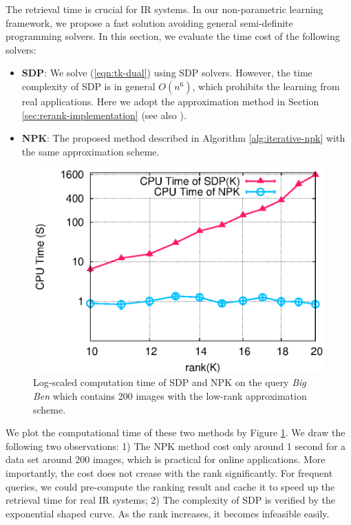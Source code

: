 The retrieval time is crucial for IR systems. In our non-parametric learning
framework, we propose a fast solution avoiding general semi-definite
programming solvers. In this section, we evaluate the time cost of the
following solvers:
\begin{itemize}
    \item {\bf SDP}: We solve (\ref{eqn:tk-dual}) using SDP solvers. However,
     the time complexity of SDP is in general $O(n^6)$, which prohibits
     the learning from real applications. Here we adopt the approximation
     method in Section \ref{sec:rerank-implementation} (see also
     \cite{nips/SongSBG07}).
    \item {\bf NPK}: The proposed method described in Algorithm \ref{alg:iterative-npk} with the same approximation scheme.
\end{itemize}

\begin{figure}[!ht]\label{fig:civr-time}
\begin{center}
\includegraphics[width=5in]{figures/cvir_time.eps}
\caption{Log-scaled computation time of SDP and NPK on the query {\em Big Ben} which contains 200 images with the
low-rank approximation scheme.}
\end{center}%
\end{figure}

We plot the computational time of these two methods by Figure
\ref{fig:civr-time}. We draw the following two observations: 1) The NPK
method cost only around 1 second for a data set around 200 images, which
is practical for online applications. More importantly, the cost does not
crease with the rank significantly. For frequent queries, we could
pre-compute the ranking result and cache it to speed up the retrieval time
for real IR systems; 2) The complexity of SDP is verified by the
exponential shaped curve. As the rank increases, it becomes infeasible
easily.


